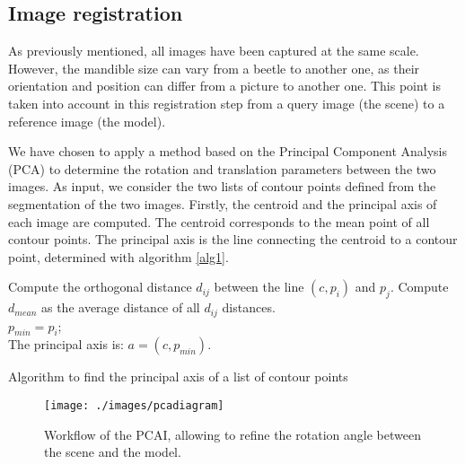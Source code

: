 \documentclass[twoside,twocolumn,10pt]{article}
\begin{document}
\subsection{Image registration}
\label{sec:registration}

As previously mentioned, all images have been captured at the same scale.
However, the mandible size can vary from a beetle to another one, as their orientation and position can differ from a picture to another one.
This point is taken into account in this registration step from a query image (the scene) to a reference image (the model).

We have chosen to apply a method based on the Principal Component Analysis (PCA) \cite{bsspca,shlens2014tutorial} to determine the rotation and translation parameters between the two images.
As input, we consider the two lists of contour points defined from the segmentation of the two images.
Firstly, the centroid and the principal axis of each image are computed.
The centroid corresponds to the mean point of all contour points.
The principal axis is the line connecting the centroid to a contour point, determined with algorithm \ref{alg1}.

\begin{algorithm}
	{
		{
			{
				Compute the orthogonal distance $d_{ij}$ between the line $(c,p_i)$ and $p_j$.
			}
		}
		Compute $d_{mean}$ as the average distance of all $d_{ij}$ distances.\\

		{
			$p_{min} = p_i$;\\
		}
	}
	The principal axis is: $a = (c,p_{min})$.
	\caption{Algorithm to find the principal axis of a list of contour points}
	\label{alg1}
\end{algorithm}

\begin{figure}[htbp]
    \centering
    \texttt{[image: ./images/pcadiagram]}
    \caption{Workflow of the PCAI, allowing to refine the rotation angle between the scene and the model.}
    \label{fig:pcai}
\end{figure}
\end{document}
